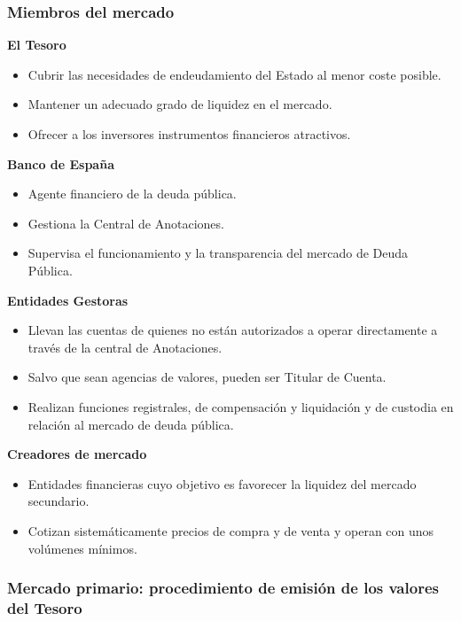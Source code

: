\documentclass[
  letterpaper,
  DIV=11,
  numbers=noendperiod]{scrartcl}
\begin{document}
\hypertarget{miembros-del-mercado}{%
\subsubsection{Miembros del mercado}\label{miembros-del-mercado}}

\textbf{El Tesoro}

\begin{itemize}
\item
  Cubrir las necesidades de endeudamiento del Estado al menor coste
  posible.
\item
  Mantener un adecuado grado de liquidez en el mercado.
\item
  Ofrecer a los inversores instrumentos financieros atractivos.
\end{itemize}

\textbf{Banco de España}

\begin{itemize}
\item
  Agente financiero de la deuda pública.
\item
  Gestiona la Central de Anotaciones.
\item
  Supervisa el funcionamiento y la transparencia del mercado de Deuda
  Pública.
\end{itemize}

\textbf{Entidades Gestoras}

\begin{itemize}
\item
  Llevan las cuentas de quienes no están autorizados a operar
  directamente a través de la central de Anotaciones.
\item
  Salvo que sean agencias de valores, pueden ser Titular de Cuenta.
\item
  Realizan funciones registrales, de compensación y liquidación y de
  custodia en relación al mercado de deuda pública.
\end{itemize}

\textbf{Creadores de mercado}

\begin{itemize}
\item
  Entidades financieras cuyo objetivo es favorecer la liquidez del
  mercado secundario.
\item
  Cotizan sistemáticamente precios de compra y de venta y operan con
  unos volúmenes mínimos.
\end{itemize}

\hypertarget{mercado-primario-procedimiento-de-emisiuxf3n-de-los-valores-del-tesoro}{%
\subsubsection{Mercado primario: procedimiento de emisión de los valores
del
Tesoro}\label{mercado-primario-procedimiento-de-emisiuxf3n-de-los-valores-del-tesoro}}
\end{document}
